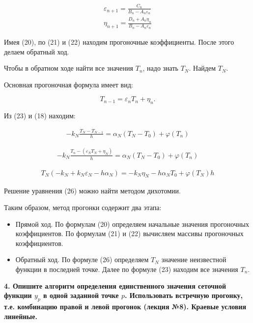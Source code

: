 \documentclass[a4paper,14pt]{article}
\begin{document}
\begin{eqnarray}
	\varepsilon_{n+1} = \frac{C_n}{B_n - A_n \varepsilon_n} \\
	\eta_{n+1} = \frac{D_n + A_n \eta_n}{B_n - A_n \varepsilon_n}
\end{eqnarray}

Имея (20), по (21) и (22) находим прогоночные коэффициенты.
После этого делаем обратный ход. 

Чтобы в обратном ходе найти все значения $T_n$, надо знать $T_N$.
Найдем $T_N$.

Основная прогоночная формула имеет вид:

\begin{equation}
	T_{n-1} = \varepsilon_n T_n + \eta_{n}.
\end{equation}

Из (23) и (18) находим:

\begin{eqnarray}
	-k_N \frac{T_N - T_{N-1}}{h} = \alpha_N(T_N - T_0) + \varphi(T_n)
\end{eqnarray}

\begin{eqnarray}
	-k_N \frac{T_n - (\varepsilon_N T_N + \eta_N)}{h} = \alpha_N(T_N - T_0) + \varphi(T_n)
\end{eqnarray}

\begin{eqnarray}
	T_N \left( -k_N + k_N \varepsilon_N - h \alpha_N \right) = -k_N \eta_N - h \alpha_N T_0 + \varphi(T_N) h
\end{eqnarray}

Решение уравнения (26) можно найти методом дихотомии.

Таким образом, метод прогонки содержит два этапа:

\begin{itemize}
	\item Прямой ход. По формулам (20) определяем начальные значения
		  прогоночных коэффициентов. По формулам (21) и (22) вычисляем массивы прогоночных
		  коэффициентов.
	\item Обратный ход. По формуле (26) определяем $T_N$ значение неизвестной функции в последней точке.
		  Далее по формуле (23) находим все значения $T_n$.
\end{itemize}

\textbf{4. Опишите алгоритм определения единственного значения сеточной функции
$y_p$ в одной заданной точке $p$. Использовать встречную прогонку,
т.е. комбинацию правой и левой прогонок (лекция №8). 
Краевые условия линейные.}
\end{document}

